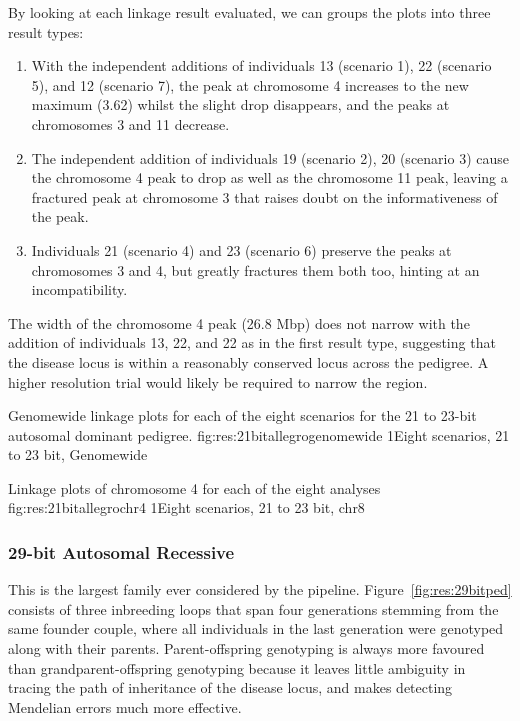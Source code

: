 By looking at each linkage result evaluated, we can groups the plots into three result types:
\begin{enumerate}
\item{With the independent additions of individuals 13 (scenario 1),  22 (scenario 5), and 12 (scenario 7),  the peak at chromosome 4 increases to the new maximum (3.62) whilst the slight drop disappears, and the peaks at chromosomes 3 and 11 decrease.}
\item{The independent addition of individuals 19 (scenario 2), 20 (scenario 3) cause the chromosome 4 peak to drop as well as the chromosome 11 peak, leaving a fractured peak at chromosome 3 that raises doubt on the informativeness of the peak.}
\item{Individuals 21 (scenario 4) and 23 (scenario 6) preserve the peaks at chromosomes 3 and 4, but greatly fractures them both too, hinting at an incompatibility.}
\end{enumerate}

The width of the chromosome 4 peak (26.8 Mbp) does not narrow with the addition of individuals 13, 22, and 22 as in the first result type, suggesting that the disease locus is within a reasonably conserved locus across the pedigree. A higher resolution trial would likely be required to narrow the region.

	{Genomewide linkage plots for each of the eight scenarios for the 21 to 23-bit autosomal dominant pedigree.}
	{fig:res:21bitallegrogenomewide}
	{1}{Eight scenarios, 21 to 23 bit, Genomewide}
	
	
	{Linkage plots of chromosome 4 for each of the eight analyses}
	{fig:res:21bitallegrochr4}
	{1}{Eight scenarios, 21 to 23 bit, chr8}


\subsubsection{29-bit Autosomal Recessive}
This is the largest family ever considered by the pipeline. Figure~\ref{fig:res:29bitped}  consists of three inbreeding loops  that span four generations stemming from the same founder couple, where all individuals in the last generation were genotyped along with their parents. Parent-offspring genotyping is always more favoured than grandparent-offspring genotyping because it leaves little ambiguity in tracing the path of inheritance of the disease locus, and makes detecting Mendelian errors much more effective. 

